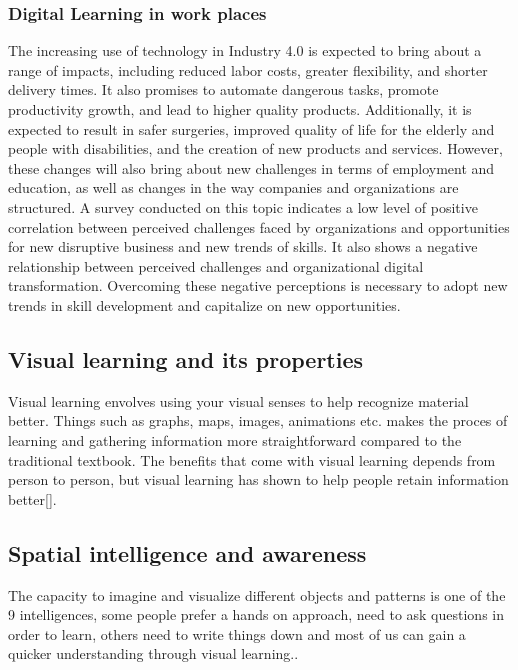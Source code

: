 \subsubsection*{Digital Learning in work places}\label{sec:digital_learning_work_places}

The increasing use of technology in Industry 4.0 is expected to bring about a range of impacts, including reduced labor costs, greater flexibility, and shorter delivery times. It also promises to automate dangerous tasks, promote productivity growth, and lead to higher quality products.
Additionally, it is expected to result in safer surgeries, improved quality of life for the elderly and people with disabilities, and the creation of new products and services. However, these changes will also bring about new challenges in terms of employment and education, as well as changes in the way companies and organizations are structured.
A survey conducted on this topic indicates a low level of positive correlation between perceived challenges faced by organizations and opportunities for new disruptive business and new trends of skills.
It also shows a negative relationship between perceived challenges and organizational digital transformation. Overcoming these negative perceptions is necessary to adopt new trends in skill development and capitalize on new opportunities.\cite*{Skills_Digital_Learning}

\subsection{Visual learning and its properties}\label{sec:visual_learning_and_its_properties}
Visual learning envolves using your visual senses to help recognize material better. Things such as graphs, maps, images, animations etc. makes the proces of learning and gathering information more straightforward compared to the traditional textbook. The benefits that come with visual learning depends from person to person, but visual learning has shown to help people retain information better[].


\subsection{Spatial intelligence and awareness}\label{sec:spatial_intelligence_and_awareness}
The capacity to imagine and visualize different objects and patterns is one of the 9 intelligences, some people prefer a hands on approach, need to ask questions in order to learn, others need to write things down and most of us can gain a quicker understanding through visual learning.\cite*{pracpsych2022}.

